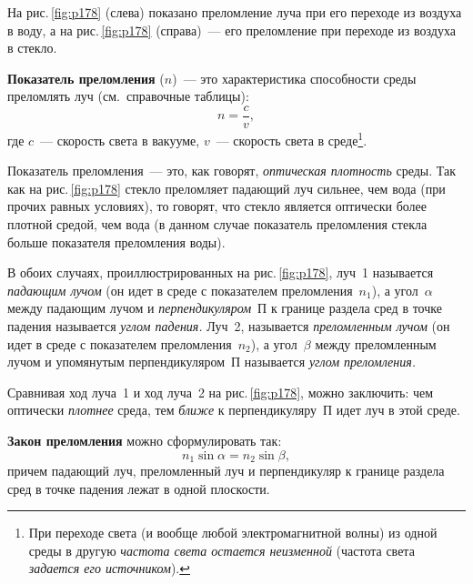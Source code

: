 \documentclass[main.tex]{subfiles}
\begin{document}
На рис.\,\ref{fig:p178} (слева) показано преломление луча при его переходе из воздуха в воду, а на рис.\,\ref{fig:p178} (справа)~--- его преломление при переходе из воздуха в стекло. 

\textbf{Показатель преломления} ($n$)~--- это характеристика способности среды преломлять луч (см.~справочные таблицы):
\begin{equation}
    n=\frac{c}{v},
\end{equation}
где $c$~--- скорость света в вакууме, $v$~--- скорость света в среде\footnote{При переходе света (и вообще любой электромагнитной волны) из одной среды в другую \emph{частота света остается неизменной} (частота света \emph{задается его источником}).}.

Показатель преломления~--- это, как говорят, \emph{оптическая плотность} среды. Так как на рис.\,\ref{fig:p178} стекло преломляет падающий луч сильнее, чем вода (при прочих равных условиях), то говорят, что стекло является оптически более плотной средой, чем вода (в данном случае показатель преломления стекла больше показателя преломления воды).

В обоих случаях, проиллюстрированных на рис.\,\ref{fig:p178}, луч~1 называется \emph{падающим лучом} (он идет в среде с показателем преломления~$n_1$), а угол~$\alpha$ между падающим лучом и \emph{перпендикуляром}~П к границе раздела сред в точке падения называется \emph{углом падения.} Луч~2, называется \emph{преломленным лучом} (он идет в среде с показателем преломления~$n_2$), а угол~$\beta$ между преломленным лучом и упомянутым перпендикуляром~П называется \emph{углом преломления.}   

Сравнивая ход луча~1 и ход луча~2 на рис.\,\ref{fig:p178}, можно заключить: чем оптически \emph{плотнее} среда, тем \emph{ближе} к перпендикуляру~П идет луч в этой среде. 

\textbf{Закон преломления} можно сформулировать так:
    \begin{equation}
        \label{3refr_e1}
        n_1\sin\alpha=n_2\sin\beta,
    \end{equation}
причем падающий луч, преломленный луч и перпендикуляр к границе раздела сред в точке падения лежат в одной плоскости.


























 
\end{document}

